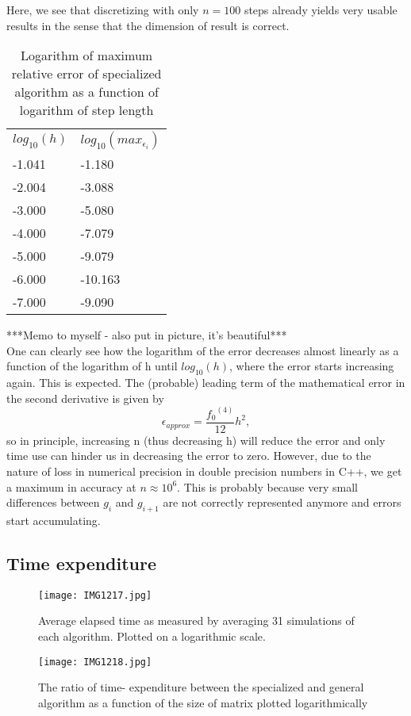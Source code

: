 \documentclass[10pt,a4paper]{article}
\begin{document}
Here, we see that discretizing with only $n=100$ steps already yields very usable results in the sense that the dimension of result is correct.
\begin{table}[H]
\caption[Relative error of specialized algorithm]{Logarithm of maximum relative error of specialized algorithm as a function of logarithm of step length}
\begin{tabular}{ll}
$log_{10}(h)$ &  $log_{10}(max_{\epsilon_i})$ \\
 -1.041 & -1.180 \\
 -2.004 & -3.088 \\
 -3.000 & -5.080 \\
 -4.000 & -7.079 \\
 -5.000 & -9.079 \\
 -6.000 & -10.163 \\
 -7.000 & -9.090 

\end{tabular}
\end{table}
***Memo to myself - also put in picture, it's beautiful***\\
One can clearly see how the logarithm of the error decreases almost linearly as a function of the logarithm of h until $log_{10}(h)$, where the error starts increasing again. This is expected. The (probable) leading term of the mathematical error in the second derivative is given by $$\epsilon_{approx}=\frac{{f_0}^{(4)}}{12}h^2,$$ so in principle, increasing n (thus decreasing h) will reduce the error and only time use can hinder us in decreasing the error to zero. However, due to the nature of loss in numerical precision in double precision numbers in C++, we get a maximum in accuracy at $n \approx 10^6$.  This is probably because very small differences between $g_i$ and $g_{i+1}$
 are not correctly represented anymore and errors start accumulating.
\subsection{Time expenditure}

\begin{center}
\begin{figure}[H]
\texttt{[image: IMG1217.jpg]} \label{Elapsed time comparison}
	\caption[Comparing elapsed time]{Average elapsed time as measured by averaging 31 simulations of each algorithm. Plotted on a logarithmic scale.}
\end{figure}
\end{center}
\begin{center}
\begin{figure}[H]
	\texttt{[image: IMG1218.jpg]}
	\caption[Comparing general and specialized (elapsed time)]{The ratio of time- expenditure between the specialized and general algorithm as a function of the size of matrix plotted logarithmically}
\end{figure}
\end{center}
\end{document}
